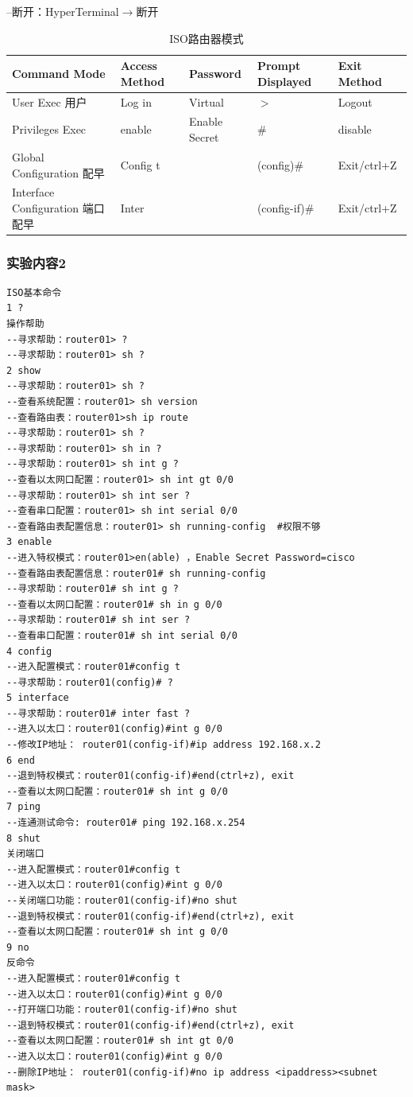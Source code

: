 \documentclass[lang=cn,11pt,a4paper,cite=authoryear]{elegantpaper}
\begin{document}
--断开：HyperTerminal$\rightarrow$断开
\begin{table}[htbp]
\begin{tabular}{|l|l|l|l|l|}
	\hline Command Mode & Access Method & Password & Prompt Displayed & Exit Method \\
	\hline User Exec 用户 & Log in & Virtual & $>$ & Logout \\
	\hline Privileges Exec & enable & Enable Secret & $\#$ & disable \\
	\hline Global Configuration 配早 & Config t & & (config)$\#$ & Exit/ctrl+Z \\
	\hline Interface Configuration 端口配早 & Inter & & (config-if)$\#$ & Exit/ctrl+Z \\
	\hline
\end{tabular}
\caption{ISO路由器模式}
\end{table}
\subsubsection{实验内容2}
\begin{lstlisting}
ISO基本命令
1 ?
操作帮助
--寻求帮助：router01> ?
--寻求帮助：router01> sh ?
2 show
--寻求帮助：router01> sh ?
--查看系统配置：router01> sh version
--查看路由表：router01>sh ip route
--寻求帮助：router01> sh ?
--寻求帮助：router01> sh in ?
--寻求帮助：router01> sh int g ?
--查看以太网口配置：router01> sh int gt 0/0
--寻求帮助：router01> sh int ser ?
--查看串口配置：router01> sh int serial 0/0
--查看路由表配置信息：router01> sh running-config  #权限不够
3 enable
--进入特权模式：router01>en(able) ，Enable Secret Password=cisco
--查看路由表配置信息：router01# sh running-config 
--寻求帮助：router01# sh int g ?
--查看以太网口配置：router01# sh in g 0/0
--寻求帮助：router01# sh int ser ?
--查看串口配置：router01# sh int serial 0/0
4 config
--进入配置模式：router01#config t
--寻求帮助：router01(config)# ?
5 interface
--寻求帮助：router01# inter fast ?
--进入以太口：router01(config)#int g 0/0
--修改IP地址： router01(config-if)#ip address 192.168.x.2
6 end
--退到特权模式：router01(config-if)#end(ctrl+z), exit
--查看以太网口配置：router01# sh int g 0/0
7 ping 
--连通测试命令: router01# ping 192.168.x.254
8 shut
关闭端口
--进入配置模式：router01#config t
--进入以太口：router01(config)#int g 0/0
--关闭端口功能：router01(config-if)#no shut
--退到特权模式：router01(config-if)#end(ctrl+z), exit
--查看以太网口配置：router01# sh int g 0/0
9 no
反命令
--进入配置模式：router01#config t
--进入以太口：router01(config)#int g 0/0
--打开端口功能：router01(config-if)#no shut
--退到特权模式：router01(config-if)#end(ctrl+z), exit
--查看以太网口配置：router01# sh int gt 0/0
--进入以太口：router01(config)#int g 0/0
--删除IP地址： router01(config-if)#no ip address <ipaddress><subnet mask>

\end{lstlisting}
\end{document}

